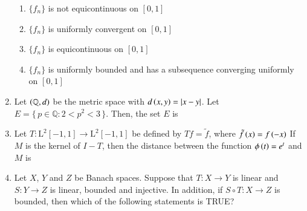 \documentclass[journal,12pt,onecolumn]{IEEEtran}
\theoremstyle{remark}
\begin{document}
\begin{enumerate}
\hfill{}

\begin{enumerate}
\item $\{f_{n}\}$ is not equicontinuous on $[0,1]$
\item $\{f_{n}\}$ is uniformly convergent on $[0,1]$
\item $\{f_{n}\}$ is equicontinuous on $[0,1]$
\item $\{f_{n}\}$ is uniformly bounded and has a subsequence converging uniformly on $[0,1]$
\end{enumerate}
\newpage
\item Let $\left(\mathbb{Q}, d\right)$ be the metric space with $d\left(x, y\right) = \left\vert x - y\right\vert$. Let $E = \{\, p \in \mathbb{Q} \colon 2 < p^{2} < 3 \,\}$. Then, the set $E$ is

\hfill{}

\begin{enumerate}
\end{enumerate}

\item Let $T \colon \mathrm{L}^{2}{[-1,1]} \to \mathrm{L}^{2}{[-1,1]}$ be defined by $Tf=\tilde{f}$, where $\tilde{f}\left(x\right)=f\left(-x\right)$  If $M$ is the kernel of $I-T$, then the distance between the function $\phi\left(t\right)=e^{t}$ and $M$ is

\hfill{}

\begin{enumerate}
\end{enumerate}

\item Let $X$, $Y$ and $Z$ be Banach spaces. Suppose that $T \colon X \to Y$ is linear and $S \colon Y \to Z$ is linear, bounded and injective. In addition, if $S \circ T \colon X \to Z$ is bounded, then which of the following statements is TRUE?


\end{enumerate}
\end{document}
